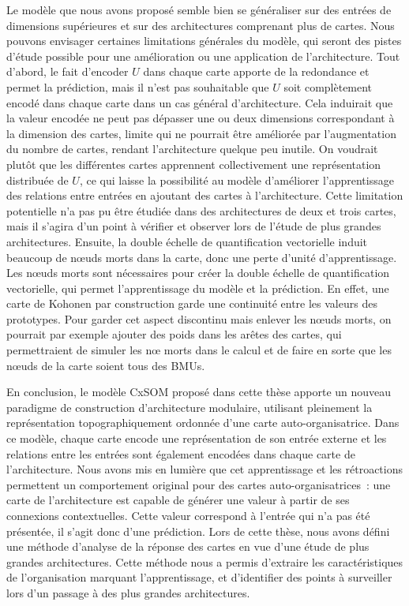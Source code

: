 Le modèle que nous avons proposé semble bien se généraliser sur des entrées de dimensions supérieures et sur des architectures comprenant plus de cartes.
Nous pouvons envisager certaines limitations générales du modèle, qui seront des pistes d'étude possible pour une amélioration ou une application de l'architecture.
Tout d'abord, le fait d'encoder $U$ dans chaque carte apporte de la redondance et permet la prédiction, mais il n'est pas souhaitable que $U$ soit complètement encodé dans chaque carte dans un cas général d'architecture.
Cela induirait que la valeur encodée ne peut pas dépasser une ou deux dimensions correspondant à la dimension des cartes, limite qui ne pourrait être améliorée par l'augmentation du nombre de cartes, rendant l'architecture quelque peu inutile. On voudrait plutôt que les différentes cartes apprennent collectivement une représentation distribuée de $U$, ce qui laisse la possibilité au modèle d'améliorer l'apprentissage des relations entre entrées en ajoutant des cartes à l'architecture. Cette limitation potentielle n'a pas pu être étudiée dans des architectures de deux et trois cartes, mais il s'agira d'un point à vérifier et observer lors de l'étude de plus grandes architectures.
Ensuite, la double échelle de quantification vectorielle induit beaucoup de n\oe{}uds morts dans la carte, donc une perte d'unité d'apprentissage. Les n\oe{}uds morts sont nécessaires pour créer la double échelle de quantification vectorielle, qui permet l'apprentissage du modèle et la prédiction. En effet, une carte de Kohonen par construction garde une continuité entre les valeurs des prototypes.
Pour garder cet aspect discontinu mais enlever les n\oe{}uds morts, on pourrait par exemple ajouter des poids dans les arêtes des cartes, qui permettraient de simuler les n\oe{} morts dans le calcul et de faire en sorte que les n\oe{}uds de la carte soient tous des BMUs.
   

En conclusion, le modèle CxSOM proposé dans cette thèse apporte un nouveau paradigme de construction d'architecture modulaire, utilisant pleinement la représentation topographiquement ordonnée d'une carte auto-organisatrice. Dans ce modèle, chaque carte encode une représentation de son entrée externe et les relations entre les entrées sont également encodées dans chaque carte de l'architecture. 
Nous avons mis en lumière que cet apprentissage et les rétroactions permettent un comportement original pour des cartes auto-organisatrices~: une carte de l'architecture est capable de générer une valeur à partir de ses connexions contextuelles. Cette valeur correspond à l'entrée qui n'a pas été présentée, il s'agit donc d'une prédiction.
Lors de cette thèse, nous avons défini une méthode d'analyse de la réponse des cartes en vue d'une étude de plus grandes architectures. Cette méthode nous a permis d'extraire les caractéristiques de l'organisation marquant l'apprentissage, et d'identifier des points à surveiller lors d'un passage à des plus grandes architectures.

